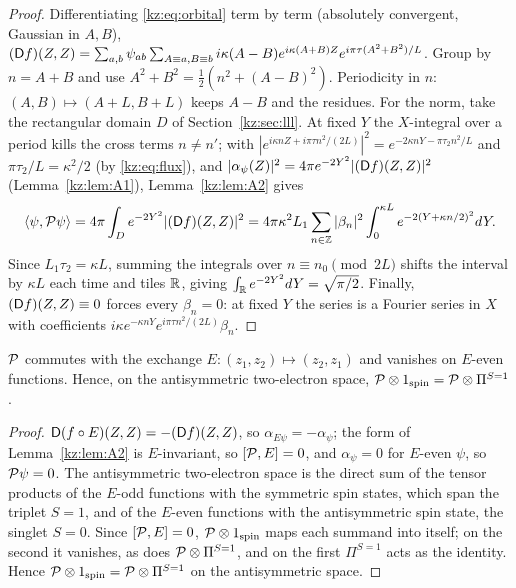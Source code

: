 \begin{proof}
Differentiating \eqref{kz:eq:orbital} term by term (absolutely convergent, Gaussian in $A,B$),
$(\mathsf{D} f)(Z,Z)=\sum_{a,b}\psi_{ab}\sum_{A\equiv a,B\equiv b}i\kappa(A-B)e^{i\kappa(A+B)Z}e^{i\pi\tau(A^2+B^2)/L}$.
Group by $n=A+B$ and use $A^2+B^2=\tfrac12(n^2+(A-B)^2)$. Periodicity in $n$: $(A,B)\mapsto(A+L,B+L)$
keeps $A-B$ and the residues. For the norm, take the rectangular domain $D$ of Section~\ref{kz:sec:lll}. At fixed $Y$ the
$X$-integral over a period kills the cross terms $n\neq n'$; with
$|e^{i\kappa nZ+i\pi\tau n^2/(2L)}|^2=e^{-2\kappa nY-\pi\tau_2n^2/L}$ and $\pi\tau_2/L=\kappa^2/2$
(by \eqref{kz:eq:flux}), and $|\alpha_\psi(Z)|^2=4\pi e^{-2Y^2}|(\mathsf{D} f)(Z,Z)|^2$ (Lemma~\ref{kz:lem:A1}),
Lemma~\ref{kz:lem:A2} gives
\[
\langle\psi,\mathcal{P}\psi\rangle=4\pi\int_De^{-2Y^2}|(\mathsf{D} f)(Z,Z)|^2=4\pi\kappa^2L_1\sum_{n\in\mathbb{Z}}|\beta_n|^2\int_0^{\kappa L}e^{-2(Y+\kappa n/2)^2}dY .
\]
Since $L_1\tau_2=\kappa L$, summing the integrals over
$n\equiv n_0\pmod{2L}$ shifts the interval by $\kappa L$ each time and tiles $\mathbb{R}$, giving
$\int_{\mathbb{R}} e^{-2Y^2}dY=\sqrt{\pi/2}$. Finally, $(\mathsf{D} f)(Z,Z)\equiv0$ forces every $\beta_n=0$: at fixed
$Y$ the series is a Fourier series in $X$ with coefficients $i\kappa e^{-\kappa nY}e^{i\pi\tau n^2/(2L)}\beta_n$.
\end{proof}

\begin{lemma}\label{kz:lem:A4}
$\mathcal{P}$ commutes with the exchange $E:(z_1,z_2)\mapsto(z_2,z_1)$ and vanishes on $E$-even functions. Hence,
on the antisymmetric two-electron space, $\mathcal{P}\otimes1_{\rm spin}=\mathcal{P}\otimes\Pi^{S=1}$.
\end{lemma}

\begin{proof}
$\mathsf{D}(f\circ E)(Z,Z)=-(\mathsf{D} f)(Z,Z)$, so $\alpha_{E\psi}=-\alpha_\psi$; the form of Lemma~\ref{kz:lem:A2} is
$E$-invariant, so $[\mathcal{P},E]=0$, and $\alpha_\psi=0$ for $E$-even $\psi$, so $\mathcal{P}\psi=0$. The antisymmetric two-electron
space is the direct sum of the tensor products of the $E$-odd functions with the symmetric spin states, which span
the triplet $S=1$, and of the $E$-even functions with the antisymmetric spin state, the singlet $S=0$. Since
$[\mathcal{P},E]=0$, $\mathcal{P}\otimes1_{\rm spin}$ maps each summand into itself; on the second it vanishes, as does
$\mathcal{P}\otimes\Pi^{S=1}$, and on the first $\Pi^{S=1}$ acts as the identity. Hence $\mathcal{P}\otimes1_{\rm spin}=\mathcal{P}\otimes\Pi^{S=1}$
on the antisymmetric space.
\end{proof}

